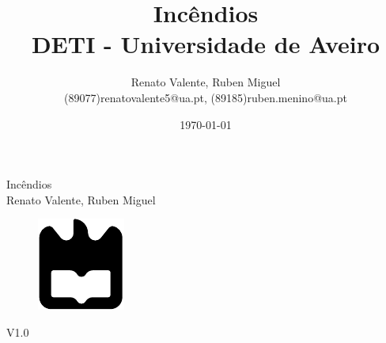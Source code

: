 \documentclass[a4paper,11pt]{report}
\makeatletter
\def\titulo{Incêndios}
\def\data{\today}
\def\autores{Renato Valente, Ruben Miguel}
\def\autorescontactos{(89077)renatovalente5@ua.pt, (89185)ruben.menino@ua.pt}
\def\versao{V1.0}
\def\departamento{DETI - Universidade de Aveiro}
\makeatother
\begin{document}
%
%
\begin{titlepage}

\begin{center}
%
\vspace*{50mm}
%
{\Huge \titulo}\\ 
%
\vspace{10mm}
%
{\LARGE \autores}\\ 
%
%
\vspace{30mm}
%
\begin{figure}[h]
\center
\includegraphics{ua.pdf}
\end{figure}
%
\vspace{30mm}
\end{center}
%
\begin{flushright}
\versao
\end{flushright}
\end{titlepage}

%
%
%
%
\title{%
{\Huge\textbf{\titulo}}\\
{\Large \departamento\\}
}
%
\author{%
    \autores \\
    \autorescontactos
}
%
\date{\data}
%
\maketitle

\clearpage




\end{document}
